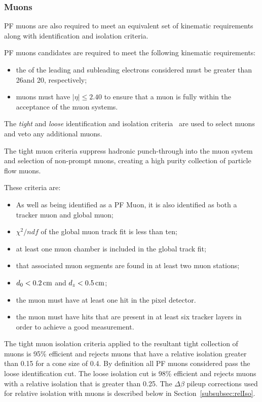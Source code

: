 \subsubsection{Muons}\label{subsubsec:muonSelection}
PF muons are also required to meet an equivalent set of kinematic requirements along with identification and isolation criteria.

PF muons candidates are required to meet the following kinematic requirements:
\begin{itemize}
\item the \pt of the leading and subleading electrons considered must be greater than 26\GeVc and 20\GeVc, respectively;
\item muons must have $|\eta| \leq 2.40$ to ensure that a muon is fully within the acceptance of the muon systems.
\end{itemize}

The \emph{tight} and \emph{loose} identification and isolation criteria~\cite{Chatrchyan:2012xi} are used to select muons and veto any additional muons.

The tight muon criteria suppress hadronic punch-through into the muon system and selection of non-prompt muons, creating a high purity collection of particle flow muons.

These criteria are:
\begin{itemize}
\item As well as being identified as a PF Muon, it is also identified as both a tracker muon and global muon;
\item $\chi^{2}/ndf$ of the global muon track fit is less than ten;
\item at least one muon chamber is included in the global track fit;
\item that associated muon segments are found in at least two muon stations;
\item $d_{0} < 0.2\,\text{cm}$ and $d_{z} < 0.5\,\text{cm}$;
\item the muon must have at least one hit in the pixel detector.
\item the muon must have hits that are present in at least six tracker layers in order to achieve a good \pT measurement.
\end{itemize}

The tight muon isolation criteria applied to the resultant tight collection of muons is 95\% efficient and rejects muons that have a relative isolation greater than 0.15 for a cone size of 0.4.
By definition all PF muons considered pass the loose identification cut.
The loose isolation cut is 98\% efficient and rejects muons with a relative isolation that is greater than 0.25.
The $\Delta\beta$ pileup corrections used for relative isolation with muons is described below in Section~\ref{subsubsec:relIso}.

